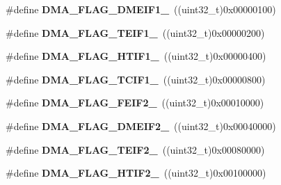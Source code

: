 \begin{DoxyCompactItemize}
\item 
\#define {\bfseries D\+M\+A\+\_\+\+F\+L\+A\+G\+\_\+\+D\+M\+E\+I\+F1\+\_}~((uint32\+\_\+t)0x00000100)\hypertarget{group___d_m_a__flag__definitions_gaae665bbda7f888f0b8ac3d10688bfc5d}{}\label{group___d_m_a__flag__definitions_gaae665bbda7f888f0b8ac3d10688bfc5d}

\item 
\#define {\bfseries D\+M\+A\+\_\+\+F\+L\+A\+G\+\_\+\+T\+E\+I\+F1\+\_}~((uint32\+\_\+t)0x00000200)\hypertarget{group___d_m_a__flag__definitions_ga9d4c5bac7bdcdb23b4d38186e918ae9e}{}\label{group___d_m_a__flag__definitions_ga9d4c5bac7bdcdb23b4d38186e918ae9e}

\item 
\#define {\bfseries D\+M\+A\+\_\+\+F\+L\+A\+G\+\_\+\+H\+T\+I\+F1\+\_}~((uint32\+\_\+t)0x00000400)\hypertarget{group___d_m_a__flag__definitions_ga2c9522a20a6ace45958413034b7f3af8}{}\label{group___d_m_a__flag__definitions_ga2c9522a20a6ace45958413034b7f3af8}

\item 
\#define {\bfseries D\+M\+A\+\_\+\+F\+L\+A\+G\+\_\+\+T\+C\+I\+F1\+\_}~((uint32\+\_\+t)0x00000800)\hypertarget{group___d_m_a__flag__definitions_ga9546185449ae979fad0aa5e33310c0ab}{}\label{group___d_m_a__flag__definitions_ga9546185449ae979fad0aa5e33310c0ab}

\item 
\#define {\bfseries D\+M\+A\+\_\+\+F\+L\+A\+G\+\_\+\+F\+E\+I\+F2\+\_}~((uint32\+\_\+t)0x00010000)\hypertarget{group___d_m_a__flag__definitions_gaba3e6950c089013f9f675b83d78cab5c}{}\label{group___d_m_a__flag__definitions_gaba3e6950c089013f9f675b83d78cab5c}

\item 
\#define {\bfseries D\+M\+A\+\_\+\+F\+L\+A\+G\+\_\+\+D\+M\+E\+I\+F2\+\_}~((uint32\+\_\+t)0x00040000)\hypertarget{group___d_m_a__flag__definitions_ga8963d8e64fa5610d7617d8fe81c76704}{}\label{group___d_m_a__flag__definitions_ga8963d8e64fa5610d7617d8fe81c76704}

\item 
\#define {\bfseries D\+M\+A\+\_\+\+F\+L\+A\+G\+\_\+\+T\+E\+I\+F2\+\_}~((uint32\+\_\+t)0x00080000)\hypertarget{group___d_m_a__flag__definitions_ga7801bd49cbbe19be612718965e8c675e}{}\label{group___d_m_a__flag__definitions_ga7801bd49cbbe19be612718965e8c675e}

\item 
\#define {\bfseries D\+M\+A\+\_\+\+F\+L\+A\+G\+\_\+\+H\+T\+I\+F2\+\_}~((uint32\+\_\+t)0x00100000)\hypertarget{group___d_m_a__flag__definitions_ga2ae0054d63c453a14b6d3822c503e7b4}{}\label{group___d_m_a__flag__definitions_ga2ae0054d63c453a14b6d3822c503e7b4}


\end{DoxyCompactItemize}

